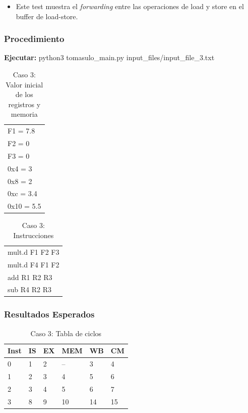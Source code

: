 \documentclass[a4paper]{article}
\begin{document}
	\begin{itemize}
		\item Este test muestra el \textit{forwarding} entre las operaciones de load y store en el buffer de load-store.
	\end{itemize}

	\subsubsection*{Procedimiento}

	\textbf{Ejecutar:} python3 tomasulo\_main.py input\_files/input\_file\_3.txt

	\begin{table}[H]
		\centering
		\caption*{Caso 3: Valor inicial de los registros y memoria}
		\begin{tabular}{l}
			F1 = 7.8 \\
			F2 = 0 \\
			F3 = 0 \\
			0x4 = 3 \\
			0x8 = 2 \\
			0xc = 3.4 \\
			0x10 = 5.5
		\end{tabular}
	\end{table}

	\begin{table}[H]
		\centering
		\caption*{Caso 3: Instrucciones}
		\begin{tabular}{l}
		mult.d F1 F2 F3 \\
		mult.d F4 F1 F2 \\
		add R1 R2 R3 \\
		sub R4 R2 R3
		\end{tabular}
	\end{table}

	\subsubsection*{Resultados Esperados}

	\begin{table}[H]
		\centering
		\caption*{Caso 3: Tabla de ciclos}
		\begin{tabular}{|l|l|l|l|l|l|}
			\hline
			\textbf{Inst} & \textbf{IS} & \textbf{EX} & \textbf{MEM} & \textbf{WB} & \textbf{CM} \\ \hline
			0             & 1           & 2           & --           & 3           & 4           \\ \hline
			1             & 2           & 3           & 4            & 5           & 6           \\ \hline
			2             & 3           & 4           & 5            & 6           & 7           \\ \hline
			3             & 8           & 9           & 10           & 14          & 15          \\ \hline
			\end{tabular}
	\end{table}
\end{document}
